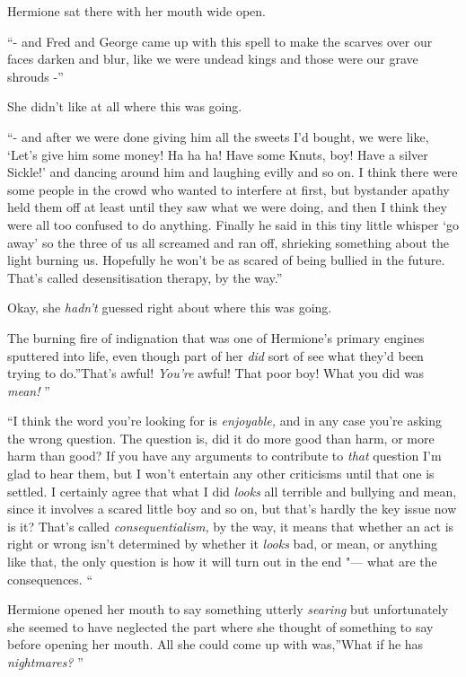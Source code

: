 Hermione sat there with her mouth wide open.

``- and Fred and George came up with this spell to make the scarves over
our faces darken and blur, like we were undead kings and those were our
grave shrouds -''

She didn't like at all where this was going.

``- and after we were done giving him all the sweets I'd bought, we were
like, `Let's give him some money! Ha ha ha! Have some Knuts, boy! Have a
silver Sickle!' and dancing around him and laughing evilly and so on. I
think there were some people in the crowd who wanted to interfere at
first, but bystander apathy held them off at least until they saw what
we were doing, and then I think they were all too confused to do
anything. Finally he said in this tiny little whisper `go away' so the
three of us all screamed and ran off, shrieking something about the
light burning us. Hopefully he won't be as scared of being bullied in
the future. That's called desensitisation therapy, by the way.''

Okay, she \emph{hadn't} guessed right about where this was going.

The burning fire of indignation that was one of Hermione's primary
engines sputtered into life, even though part of her \emph{did} sort of
see what they'd been trying to do.''That's awful! \emph{You're} awful!
That poor boy! What you did was \emph{mean!} ''

``I think the word you're looking for is \emph{enjoyable,} and in any
case you're asking the wrong question. The question is, did it do more
good than harm, or more harm than good? If you have any arguments to
contribute to \emph{that} question I'm glad to hear them, but I won't
entertain any other criticisms until that one is settled. I certainly
agree that what I did \emph{looks} all terrible and bullying and mean,
since it involves a scared little boy and so on, but that's hardly the
key issue now is it? That's called \emph{consequentialism,} by the way,
it means that whether an act is right or wrong isn't determined by
whether it \emph{looks} bad, or mean, or anything like that, the only
question is how it will turn out in the end "--- what are the consequences.
``

Hermione opened her mouth to say something utterly \emph{searing} but
unfortunately she seemed to have neglected the part where she thought of
something to say before opening her mouth. All she could come up with
was,''What if he has \emph{nightmares?} ''

